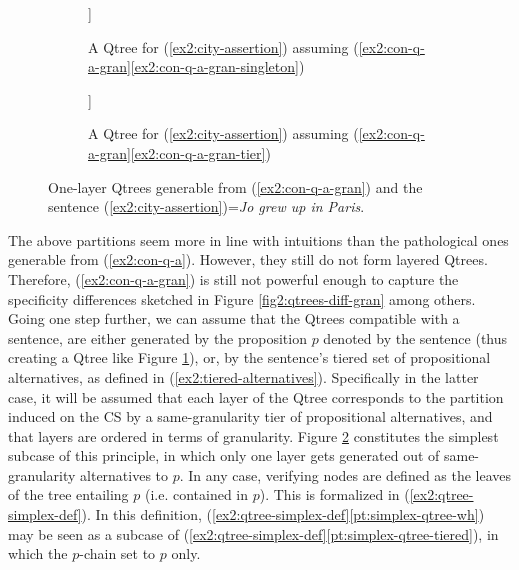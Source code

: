 \begin{figure}[H]
	\centering
	\begin{subfigure}[t]{.45\linewidth}
		\centering
		\begin{forest}
			[CS [\textcolor{orange}{Paris}] [\textcolor{orange}{$\neg${Paris}}]]
		\end{forest}
		\caption{A Qtree for (\ref{ex2:city-assertion}) assuming (\ref{ex2:con-q-a-gran}\ref{ex2:con-q-a-gran-singleton}) }\label{fig2:one-layer-polar}
	\end{subfigure}
	\hfill
	\begin{subfigure}[t]{.5\linewidth}
		\centering
		\begin{forest}
			[CS [\textcolor{orange}{Paris}] [\textcolor{orange}{Lyon}] [\textcolor{orange}{...}] [\textcolor{orange}{Berlin}] [\textcolor{orange}{...}] [\textcolor{orange}{Rome}]]
		\end{forest}
		\caption{A Qtree for (\ref{ex2:city-assertion}) assuming (\ref{ex2:con-q-a-gran}\ref{ex2:con-q-a-gran-tier})}\label{fig2:one-layer-wh}
	\end{subfigure}
	\caption{One-layer Qtrees generable from (\ref{ex2:con-q-a-gran}) and the sentence (\ref{ex2:city-assertion})=\textit{Jo grew up in Paris}.}\label{fig2:one-layer-qtrees}
\end{figure}

The above partitions seem more in line with intuitions than the pathological ones generable from (\ref{ex2:con-q-a}). However, they still do not form layered Qtrees. Therefore, (\ref{ex2:con-q-a-gran}) is still not powerful enough to capture the specificity differences sketched in Figure \ref{fig2:qtrees-diff-gran} among others. Going one step further, we can assume that the Qtrees compatible with a sentence, are either generated by the proposition $p$ denoted by the sentence (thus creating a Qtree like Figure \ref{fig2:one-layer-polar}), or, by the sentence's tiered set of propositional alternatives, as defined in (\ref{ex2:tiered-alternatives}). Specifically in the latter case, it will be assumed that each layer of the Qtree corresponds to the partition induced on the CS by a same-granularity tier of propositional alternatives, and that layers are ordered in terms of granularity. Figure \ref{fig2:one-layer-wh} constitutes the simplest subcase of this principle, in which only one layer gets generated out of same-granularity alternatives to $p$. In any case, verifying nodes are defined as the leaves of the tree entailing $p$ (i.e. contained in $p$). This is formalized in (\ref{ex2:qtree-simplex-def}). In this definition, (\ref{ex2:qtree-simplex-def}\ref{pt:simplex-qtree-wh}) may be seen as a subcase of (\ref{ex2:qtree-simplex-def}\ref{pt:simplex-qtree-tiered}), in which the $p$-chain set to $p$ only.

